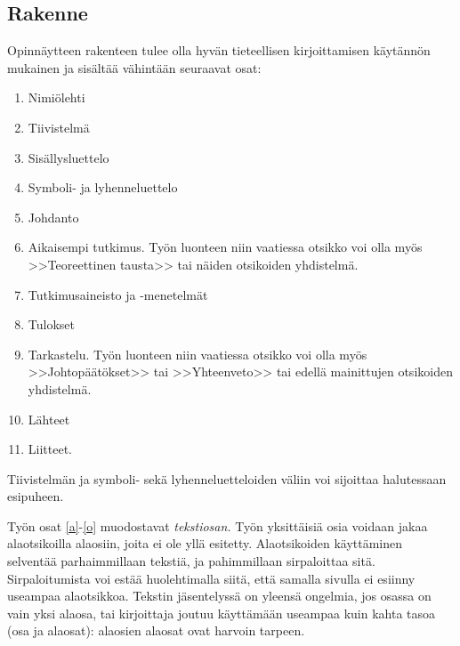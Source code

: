 \documentclass[english, 12pt, a4paper, elec, utf8, a-1b, online]{aaltothesis}
\begin{document}
\subsection*{Rakenne}

Opinn\"aytteen rakenteen tulee olla hyv\"an tieteellisen
kirjoittamisen k\"ayt\"ann\"on mukainen ja sis\"alt\"a\"a v\"ahint\"a\"an seuraavat
osat:

\begin{enumerate}
\item Nimi\"olehti
\item Tiivistelm\"a
\item Sis\"allysluettelo
\item Symboli- ja lyhenneluettelo
\item \label{a} Johdanto
\item  Aikaisempi tutkimus. Ty\"on luonteen niin vaatiessa otsikko voi olla my\"os
        >>Teoreettinen tausta>>  tai n\"aiden otsikoiden yhdistelm\"a.
\item Tutkimusaineisto ja -menetelm\"at %
\item Tulokset
\item \label{o} Tarkastelu. Ty\"on luonteen niin vaatiessa otsikko voi
      olla my\"os >>Johtop\"a\"at\"okset>> tai >>Yhteenveto>> 
      tai edell\"a mainittujen otsikoiden yhdistelm\"a.
\item L\"ahteet
\item Liitteet.
\end{enumerate}

Tiivistelm\"an ja symboli- sek\"a lyhenneluetteloiden 
v\"aliin voi sijoittaa halutessaan esipuheen.  

Ty\"on osat \ref{a}-\ref{o} muodostavat \textit{tekstiosan.}  Ty\"on
yksitt\"aisi\"a osia voidaan jakaa alaotsikoilla alaosiin, joita ei ole
yll\"a esitetty. Alaotsikoiden k\"aytt\"aminen selvent\"a\"a parhaimmillaan
teksti\"a, ja pahimmillaan sirpaloittaa sit\"a.  Sirpaloitumista voi est\"a\"a
huolehtimalla siit\"a, ett\"a samalla sivulla ei esiinny useampaa
alaotsikkoa.  Tekstin j\"asentelyss\"a on yleens\"a ongelmia, jos osassa on
vain yksi alaosa, tai kirjoittaja joutuu k\"aytt\"am\"a\"an useampaa kuin
kahta tasoa (osa ja alaosat): alaosien alaosat ovat harvoin tarpeen.
\end{document}

